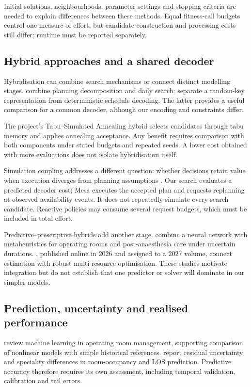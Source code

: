 Initial solutions, neighbourhoods, parameter settings and stopping criteria
are needed to explain differences between these methods. Equal fitness-call
budgets control one measure of effort, but candidate construction and
processing costs still differ; runtime must be reported separately.

\subsection{Hybrid approaches and a shared decoder}

Hybridisation can combine search mechanisms or connect distinct modelling
stages. \citet{fei2010} combine planning decomposition and daily search;
\citet{vieira2025} separate a random-key representation from deterministic
schedule decoding. The latter provides a useful comparison for a common
decoder, although our encoding and constraints differ.

The project's Tabu--Simulated Annealing hybrid selects candidates through
tabu memory and applies annealing acceptance. Any benefit requires comparison
with both components under stated budgets and repeated seeds. A lower cost
obtained with more evaluations does not isolate hybridisation itself.

Simulation coupling addresses a different question: whether decisions retain
value when execution diverges from planning assumptions
\citep{guerriero2011,rachuba2026}. Our search evaluates a predicted decoder
cost; Mesa executes the accepted plan and requests replanning at observed
availability events. It does not repeatedly simulate every search candidate.
Reactive policies may consume several request budgets, which must be included
in total effort.

Predictive--prescriptive hybrids add another stage. \citet{ahmadian2025}
combine a neural network with metaheuristics for operating rooms and
post-anaesthesia care under uncertain durations. \citet{kayvanfar2027},
published online in 2026 and assigned to a 2027 volume, connect estimation
with robust multi-resource optimisation. These studies motivate integration
but do not establish that one predictor or solver will dominate in our
simpler models.

\subsection{Prediction, uncertainty and realised performance}

\citet{merghani2025} review machine learning in operating room management,
supporting comparison of nonlinear models with simple historical references.
\citet{dupre2025} report residual uncertainty and speciality differences in
room-occupancy and LOS prediction. Predictive accuracy therefore requires
its own assessment, including temporal validation, calibration and tail errors.

